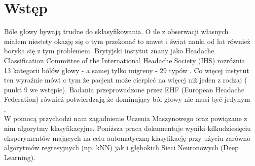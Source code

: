 \section{Wstęp}
Bóle głowy bywają trudne do sklasyfikowania. O ile z obserwacji własnych miałem niestety okazję się o tym przekonać to nawet i świat nauki od lat również boryka się z tym problemem. Brytyjski instytut znany jako Headache Classification Committee of the International Headache Society (IHS) rozróżnia 13 kategorii bólów głowy - a samej tylko migreny - 29 typów \cite{trudnosc}. Co więcej instytut ten wyraźnie mówi o tym że pacjent może cierpieć na więcej niż jeden z rodzaj (\cite{trudnosc} punkt 9 we wstępie). Badania przeprowadzone przez EHF (European Headache Federation) \cite{ehf} również potwierdzają że dominujący ból głowy nie musi być jedynym \cite{kilka}.\\

W pomocą przychodzi nam zagadnienie Uczenia Maszynowego oraz powiązane z nim algorytmy klasyfikacyjne. Poniższa praca dokumentuje wyniki kilkudziesięciu eksperymentów mających na celu automatyczną klasyfikację przy użyciu zarówno algorytmów regresyjnych (np. kNN) jak i głębokich Sieci Neuronowych (Deep Learning).